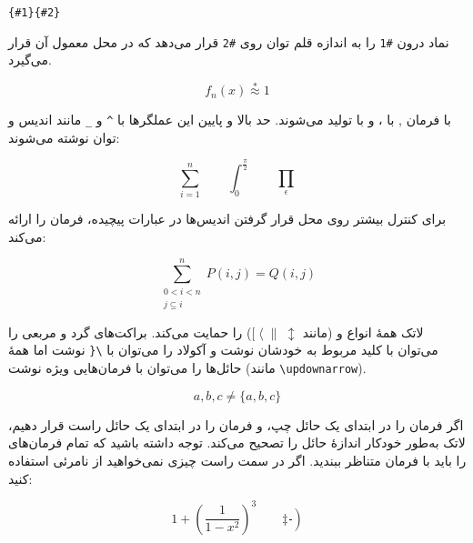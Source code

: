 \setLR
{}\verb|{#1}{#2}|
\setRL

\noindent
نماد درون \verb|#1| را به اندازه قلم توان روی \verb|#2| قرار می‌دهد که در محل معمول آن قرار می‌گیرد.
\begin{example}
\begin{equation*}
 f_n(x) \stackrel{*}{\approx} 1
\end{equation*}
\end{example}

\textbf{} 
با فرمان , \textbf{} 
با ، و \textbf{} با  تولید می‌شوند. حد بالا و پایین این عملگرها با \verb|^| و \verb|_| مانند اندیس و توان نوشته می‌شوند:
\begin{example}
\begin{equation*}
\sum_{i=1}^n \qquad
\int_0^{\frac{\pi}{2}} \qquad
\prod_\epsilon
\end{equation*}
\end{example}

برای کنترل بیشتر روی محل قرار گرفتن اندیس‌ها در عبارات پیچیده،   فرمان  را ارائه می‌کند:
\begin{example}
\begin{equation*}
\sum^n_{\substack{0<i<n \\ 
        j\subseteq i}}
   P(i,j) = Q(i,j)
\end{equation*}
\end{example}


لاتک همۀ انواع  \textbf{} 
و \textbf{}  (مانند $[\;\langle\;\|\;\updownarrow$) را حمایت می‌کند.
براکت‌های گرد و مربعی را می‌توان با کلید مربوط به خودشان نوشت و آکولاد را می‌توان با  \verb|\{| نوشت اما همۀ حائل‌ها را می‌توان با فرمان‌هایی ویژه نوشت (مانند
\verb|\updownarrow|).
\begin{example}
\begin{equation*}
{a,b,c} \neq \{a,b,c\}
\end{equation*}
\end{example}

اگر فرمان  را در ابتدای یک حائل چپ، و فرمان  را در ابتدای یک حائل راست قرار دهیم، لاتک به‌طور خودکار اندازهٔ حائل را تصحیح می‌کند. توجه داشته باشید که تمام فرمان‌های  را باید با فرمان متناظر  ببندید. اگر در سمت راست چیزی نمی‌خواهید از   نامرئی استفاده کنید:
\begin{example}
\begin{equation*}
1 + \left(\frac{1}{1-x^{2}}
    \right)^3 \qquad 
\left. \ddagger \frac{~}{~}\right)
\end{equation*}
\end{example}

